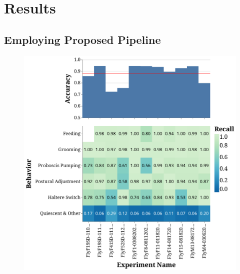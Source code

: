 \chapter{Results}

\section{Employing Proposed Pipeline}\label{section:employing-proposed-pipeline}

\begin{figure}[ht!]
	\centering
	\centering\includegraphics[width=0.675\linewidth]{figures/OutliningPerformance-Supervised.pdf}
	\caption{}
\end{figure}

